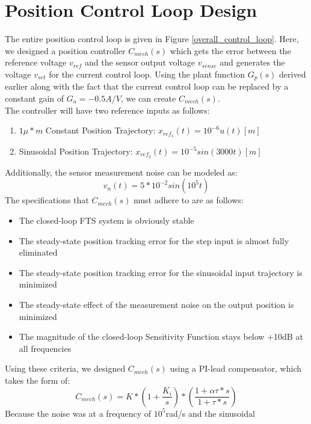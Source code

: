 \documentclass[a4paper, titlepage, 12pt]{article}
\begin{document}
	\section{Position Control Loop Design}
		The entire position control loop is given in Figure \ref{overall_control_loop}.
		Here, we designed a position controller $C_{mech}(s)$ which gets the error
		between the reference voltage $v_{ref}$ and the sensor output voltage $v_{sense}$
		and generates the voltage $v_{set}$ for the current control loop. Using
		the plant function $G_p(s)$ derived earlier along with the fact that the
		current control loop can be replaced by a constant gain of $G_a = -0.5 A/V$,
		we can create $C_{mech}(s)$.\\
		The controller will have two reference inputs as follows:
		\begin{enumerate}
			\item $1\mu*m$ Constant Position Trajectory: $x_{ref_1}(t) = 10^{-6}u(t) [m]$
			\item Sinusoidal Position Trajectory: $x_{ref_2}(t) = 10^{-5}sin(3000t) [m]$
		\end{enumerate}
		Additionally, the sensor measurement noise can be modeled as:
		\begin{equation*}
			v_n(t) = 5*10^{-2}sin(10^5t)
		\end{equation*}
		The specifications that $C_{mech}(s)$ must adhere to are as follows:
		\begin{itemize}
			\item The closed-loop FTS system is obviously stable
			\item The steady-state position tracking error for the step input is
			almost fully eliminated
			\item The steady-state position tracking error for the sinusoidal input
			trajectory is minimized
			\item The steady-state effect of the measurement noise on the output 
			position is minimized
			\item The magnitude of the closed-loop Sensitivity Function stays below
			+10dB at all frequencies
		\end{itemize}
		Using these criteria, we designed $C_{mech}(s)$ using a PI-lead compensator,
		which takes the form of: \\
		\begin{equation*}
			C_{mech}(s) = K*(1 + \frac{K_i}{s})*(\frac{1 + \alpha\tau*s}{1 + \tau*s})
		\end{equation*}
		Because the noise was at a frequency of $10^5$rad/s and the sinusoidal
\end{document}
